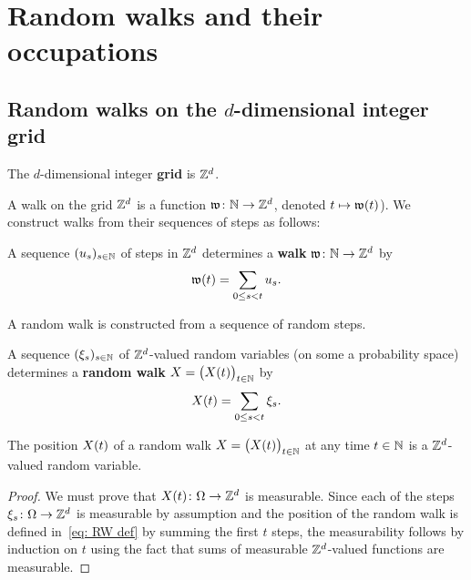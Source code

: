 \chapter{Random walks and their occupations}



\section{Random walks on the $d$-dimensional integer grid}

\begin{definition}
  \label{def:grid}
  \leanok
  The $d$-dimensional integer \textbf{grid} is $\mathbb{Z}^d$.
\end{definition}

A walk on the grid $\mathbb{Z}^d$ is a function
$\mathfrak{w} \colon \mathbb{N} \to \mathbb{Z}^d$, denoted $t \mapsto \mathfrak{w}(t)$).
We construct walks from their sequences of steps as follows:
  
\begin{definition}
  \label{def:walk}
  \leanok
  A sequence $(u_s)_{s \in \mathbb{N}}$ of steps in $\mathbb{Z}^d$
  determines a \textbf{walk} $\mathfrak{w} \colon \mathbb{N} \to \mathbb{Z}^d$ by
  \begin{align}\label{eq: RW def}
  \mathfrak{w}(t) = \sum_{0 \le s < t} u_s .
  \end{align}
\end{definition}

A random walk is constructed from a sequence of random steps.

\begin{definition}
  \label{def:random_walk}
  \leanok
  A sequence $(\xi_s)_{s \in \mathbb{N}}$ of $\mathbb{Z}^d$-valued
  random variables (on some a probability space)
  determines a \textbf{random walk} $X = \big(X(t)\big)_{t \in \mathbb{N}}$ by
  \[ X(t) = \sum_{0 \le s < t} \xi_s . \]
\end{definition}

\begin{lemma}
  \label{lem:RW_mble}
  The position $X(t)$ of a
  random walk $X = \big(X(t)\big)_{t \in \mathbb{N}}$
  at any time $t \in \mathbb{N}$ is a $\mathbb{Z}^d$-valued random variable.
\end{lemma}
\begin{proof}
We must prove that $X(t) \colon \Omega \to \mathbb{Z}^d$ is measurable.
Since each of the steps $\xi_s \colon \Omega \to \mathbb{Z}^d$ is measurable by
assumption and the position of the
random walk is defined in~\eqref{eq: RW def} by summing the
first $t$ steps, the measurability follows by induction
on $t$ using the fact that sums of measurable $\mathbb{Z}^d$-valued
functions are measurable.
\end{proof}



